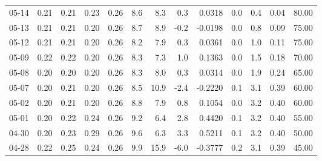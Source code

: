 \begin{threeparttable}
{\begin{tabular}{lrrrrrrrrrrrr}
  05-14 &          0.21 &          0.21 &          0.23 &        0.26 &                 8.6 &                 8.3 &        0.3 &       0.0318 &                 0.0 &              0.4 &            0.04 &                  80.00 \\
  05-13 &          0.21 &          0.21 &          0.20 &        0.26 &                 8.7 &                 8.9 &       -0.2 &      -0.0198 &                 0.0 &              0.8 &            0.09 &                  75.00 \\
  05-12 &          0.21 &          0.21 &          0.20 &        0.26 &                 8.2 &                 7.9 &        0.3 &       0.0361 &                 0.0 &              1.0 &            0.11 &                  75.00 \\
  05-09 &          0.22 &          0.22 &          0.20 &        0.26 &                 8.3 &                 7.3 &        1.0 &       0.1363 &                 0.0 &              1.5 &            0.18 &                  70.00 \\
  05-08 &          0.20 &          0.20 &          0.20 &        0.26 &                 8.3 &                 8.0 &        0.3 &       0.0314 &                 0.0 &              1.9 &            0.24 &                  65.00 \\
  05-07 &          0.20 &          0.21 &          0.20 &        0.26 &                 8.5 &                10.9 &       -2.4 &      -0.2220 &                 0.1 &              3.1 &            0.39 &                  60.00 \\
  05-02 &          0.20 &          0.21 &          0.20 &        0.26 &                 8.8 &                 7.9 &        0.8 &       0.1054 &                 0.0 &              3.2 &            0.40 &                  60.00 \\
  05-01 &          0.20 &          0.22 &          0.24 &        0.26 &                 9.2 &                 6.4 &        2.8 &       0.4420 &                 0.1 &              3.2 &            0.40 &                  55.00 \\
  04-30 &          0.20 &          0.23 &          0.29 &        0.26 &                 9.6 &                 6.3 &        3.3 &       0.5211 &                 0.1 &              3.2 &            0.40 &                  50.00 \\
  04-28 &          0.22 &          0.25 &          0.24 &        0.26 &                 9.9 &                15.9 &       -6.0 &      -0.3777 &                 0.2 &              3.1 &            0.39 &                  45.00 \\

\end{tabular}}
\end{threeparttable}
